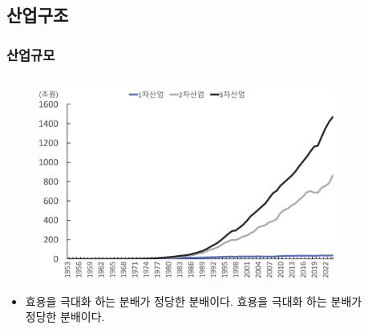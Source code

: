 \documentclass[aspectratio=169,xcolor=dvipsnames,handout]{beamer}
\begin{document}
\subsection{산업구조}
\begin{frame}
\frametitle{산업규모}
\begin{columns}
    \begin{column}{.5\textwidth}
        \begin{figure}
            \centering
            \includegraphics[width=.9\textwidth]{pic/fig_econ_03.png}
        \end{figure}
        \begin{itemize}[<+->]
            \item 효용을 극대화 하는 분배가 정당한 분배이다. 효용을 극대화 하는 분배가 정당한 분배이다.
        \end{itemize}
    \end{column}
    \begin{column}{.5\textwidth}
        \begin{figure}
            \centering

\end{figure}
\end{column}
\end{columns}
\end{frame}
\end{document}
